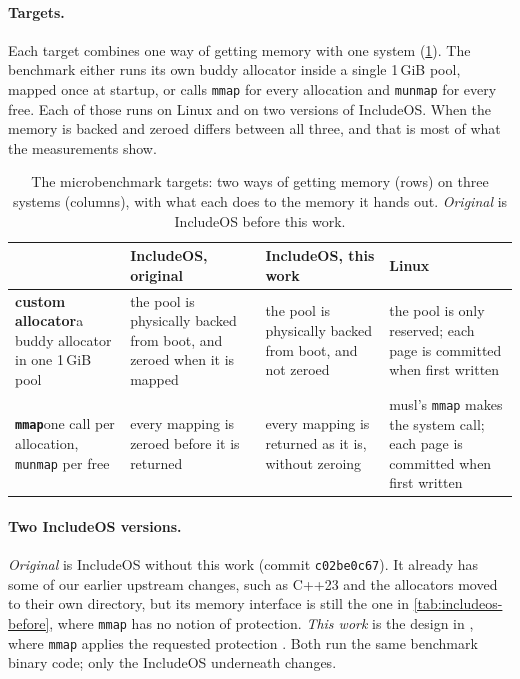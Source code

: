 \documentclass[12pt]{report}
\newcommand{\systhis}[1]{\textcolor{systhis}{\textbf{#1}}}
\newcommand{\sysorig}[1]{\textcolor{sysorig}{\textbf{#1}}}
\newcommand{\syslinux}[1]{\textcolor{syslinux}{\textbf{#1}}}
\newcommand{\fullref}[1]{\Cref{#1}}
\renewcommand{\_}{\origunderscore\allowbreak}
\begin{document}
\paragraph{Targets.} Each target combines one way of getting memory with one system (\cref{tab:micro-targets}). The benchmark either runs its own buddy allocator inside a single 1\,GiB pool, mapped once at startup, or calls \texttt{mmap} for every allocation and \texttt{munmap} for every free. Each of those runs on Linux and on two versions of IncludeOS. When the memory is backed and zeroed differs between all three, and that is most of what the measurements show.

\begin{table}[!htbp]
  \centering
  \small
  \caption{The microbenchmark targets: two ways of getting memory (rows) on three systems (columns), with what each does to the memory it hands out. \emph{Original} is IncludeOS before this work.}
  \label{tab:micro-targets}
  \begin{tabular}{>{\raggedright\arraybackslash}p{3.3cm}
                  >{\raggedright\arraybackslash}p{3.2cm}
                  >{\raggedright\arraybackslash}p{3.2cm}
                  >{\raggedright\arraybackslash}p{3.2cm}}
    \toprule
    & \sysorig{IncludeOS, original} & \systhis{IncludeOS, this work}
    & \syslinux{Linux} \\
    \midrule
    \textbf{custom allocator}\newline\footnotesize a buddy allocator in one 1\,GiB pool
      & the pool is physically backed from boot, and zeroed when it is mapped
      & the pool is physically backed from boot, and not zeroed
      & the pool is only reserved; each page is committed when first
        written \\
    \addlinespace
    \textbf{\texttt{mmap}}\newline\footnotesize one call per allocation, \texttt{munmap} per free
      & every mapping is zeroed before it is returned
      & every mapping is returned as it is, without zeroing
      & musl's \texttt{mmap} makes the system call; each page is
        committed when first written \\
    \bottomrule
  \end{tabular}
\end{table}

\paragraph{Two IncludeOS versions.} \emph{Original} is IncludeOS without this work (commit \texttt{c02be0c67}). It already has some of our earlier upstream changes, such as C++23 and the allocators moved to their own directory, but its memory interface is still the one in \cref{tab:includeos-before}, where \texttt{mmap} has no notion of protection. \emph{This work} is the design in \fullref{sec:design}, where \texttt{mmap} applies the requested protection \cite{thesis-benchmarks}. Both run the same benchmark binary code; only the IncludeOS underneath changes.
\end{document}
